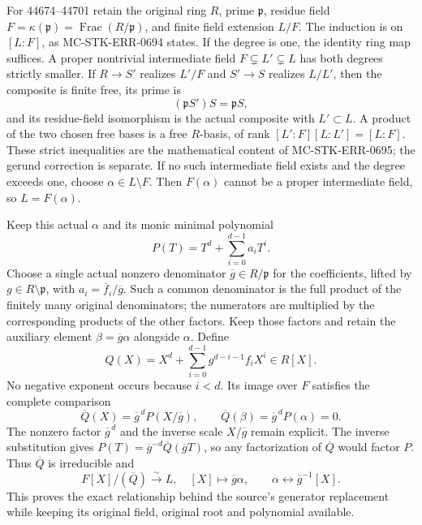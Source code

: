For 44674--44701 retain the original ring \(R\), prime \(\mathfrak p\), residue field \(F=\kappa(\mathfrak p)=\operatorname{Frac}(R/\mathfrak p)\), and finite field extension \(L/F\). The induction is on \([L:F]\), as MC-\AlgebraIdentifierBreak{}STK-\AlgebraIdentifierBreak{}ERR-\AlgebraIdentifierBreak{}0694 states. If the degree is one, the identity ring map suffices. A proper nontrivial intermediate field \(F\subsetneq L'\subsetneq L\) has both degrees strictly smaller. If \(R\to S'\) realizes \(L'/F\) and \(S'\to S\) realizes \(L/L'\), then the composite is finite free, its prime is \[
 (\mathfrak pS')S=\mathfrak pS,
\] and its residue-field isomorphism is the actual composite with \(L'\subset L\). A product of the two chosen free bases is a free \(R\)-basis, of rank \([L':F][L:L']=[L:F]\). These strict inequalities are the mathematical content of MC-\AlgebraIdentifierBreak{}STK-\AlgebraIdentifierBreak{}ERR-\AlgebraIdentifierBreak{}0695; the gerund correction is separate. If no such intermediate field exists and the degree exceeds one, choose \(\alpha\in L\setminus F\). Then \(F(\alpha)\) cannot be a proper intermediate field, so \(L=F(\alpha)\).

Keep this actual \(\alpha\) and its monic minimal polynomial \[
 P(T)=T^d+\sum_{i=0}^{d-1}a_iT^i.
\] Choose a single actual nonzero denominator \(\overline g\in R/\mathfrak p\) for the coefficients, lifted by \(g\in R\setminus\mathfrak p\), with \(a_i=\overline f_i/\overline g\). Such a common denominator is the full product of the finitely many original denominators; the numerators are multiplied by the corresponding products of the other factors. Keep those factors and retain the auxiliary element \(\beta=\overline g\alpha\) alongside \(\alpha\). Define \[
 Q(X)=X^d+\sum_{i=0}^{d-1}g^{d-i-1}f_iX^i\in R[X].
\] No negative exponent occurs because \(i<d\). Its image over \(F\) satisfies the complete comparison \[
 \overline Q(X)=\overline g^{\,d}P(X/\overline g),
 \qquad
 \overline Q(\beta)=\overline g^{\,d}P(\alpha)=0.
\] The nonzero factor \(\overline g^{\,d}\) and the inverse scale \(X/\overline g\) remain explicit. The inverse substitution gives \(P(T)=\overline g^{-d}\overline Q(\overline gT)\), so any factorization of \(\overline Q\) would factor \(P\). Thus \(\overline Q\) is irreducible and \[
 F[X]/(\overline Q)\xrightarrow{\sim}L,\quad [X]\longmapsto\overline g\alpha,
 \qquad \alpha\longleftrightarrow\overline g^{-1}[X].
\] This proves the exact relationship behind the source's generator replacement while keeping its original field, original root and polynomial available.

